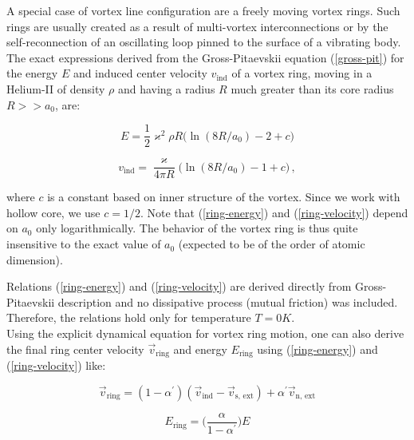 A special case of vortex line configuration are a freely moving vortex rings. Such rings are usually created as a result of multi-vortex interconnections \cite{vortex_ring} or by the self-reconnection of an oscillating loop pinned to the surface of a vibrating body. The exact expressions derived from the Gross-Pitaevskii equation (\ref{gross-pit}) \cite{roberts} for the energy $E$ and induced center velocity $v_{\text{ind}}$ of a vortex ring, moving in a Helium-II of density $\rho$ and having a radius $R$ much greater than its core radius $R >> a_0$, are:

\begin{equation}
E = \frac{1}{2}\varkappa^2 \rho R \Big(\ln(8R/a_0) - 2 + c\Big)
\label{ring-energy}
\end{equation}

\begin{equation}
v_{\text{ind}} = \frac{\varkappa}{4\pi R} \Big(\ln(8R/a_0) - 1 + c\Big)\,,
\label{ring-velocity}
\end{equation}

where $c$ is a constant based on inner structure of the vortex. Since we work with hollow core, we use \cite{donnelly_book}
$c = 1/2$. Note that (\ref{ring-energy}) and (\ref{ring-velocity}) depend on $a_0$ only logarithmically.
The behavior of the vortex ring is thus quite insensitive to the exact value of $a_0$ (expected to be of the order of atomic dimension).

Relations (\ref{ring-energy}) and (\ref{ring-velocity}) are derived directly from Gross-Pitaevskii description and no dissipative process (mutual friction) was included. Therefore, the relations hold only for temperature $T=0\unit{K}$.\\
Using the explicit dynamical equation \cite{donnelly_book} for vortex ring motion, one can also derive the final ring center velocity $\vec{v}_{\text{ring}}$ and energy $E_{\text{ring}}$ using (\ref{ring-energy}) and (\ref{ring-velocity}) like:

\begin{equation}
\vec{v}_{\text{ring}} = (1 - \alpha^{\prime}) (\vec{v}_{\text{ind}} - \vec{v}_{\text{s, ext}})
+ \alpha^{\prime} \vec{v}_{\text{n, ext}}
\label{v_ring}
\end{equation}

\begin{equation}
E_{\text{ring}} = \Big( \frac{\alpha}{1 - \alpha^{\prime}} \Big) E
\label{E_ring}
\end{equation}

